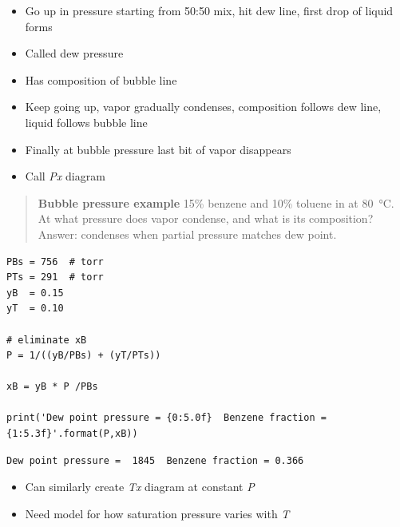 \documentclass[11pt]{article}
\begin{document}
\begin{itemize}
\item Go up in pressure starting from 50:50 mix, hit dew line, first drop of liquid forms
\item Called dew pressure
\item Has composition of bubble line
\item Keep going up, vapor gradually condenses, composition follows dew line, liquid follows bubble line
\item Finally at bubble pressure last bit of vapor disappears
\item Call \emph{Px} diagram
\end{itemize}

\begin{quote}
\hline
\textbf{Bubble pressure example} 15\% benzene and 10\% toluene in  at \SI{80}{\celsius}.  At what pressure does vapor condense, and what is its composition?  Answer: condenses when partial pressure matches dew point.
\hline
\end{quote}
\begin{verbatim}
PBs = 756  # torr
PTs = 291  # torr
yB  = 0.15
yT  = 0.10

# eliminate xB
P = 1/((yB/PBs) + (yT/PTs))

xB = yB * P /PBs

print('Dew point pressure = {0:5.0f}  Benzene fraction = {1:5.3f}'.format(P,xB))
\end{verbatim}

\begin{verbatim}
Dew point pressure =  1845  Benzene fraction = 0.366
\end{verbatim}

\begin{itemize}
\item Can similarly create \emph{Tx} diagram at constant \emph{P}
\item Need model for how saturation pressure varies with \emph{T}
\end{itemize}
\end{document}
